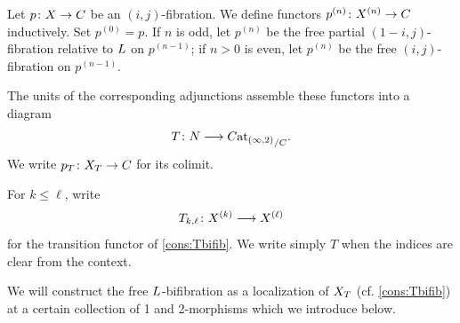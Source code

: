 \documentclass[a4paper,reqno,twoside]{amsart}
\begin{document}
\begin{construction}\label{cons:Tbifib}
	Let $p\colon\relax{X}\to\relax{C}$ be an $(i,j)$-fibration. We define functors $p^{(n)}\colon\relax{X}^{(n)}\to\relax{C}$ inductively. Set $p^{(0)}=p$. If $n$ is odd, let $p^{(n)}$ be the free partial $(1-i,j)$-fibration relative to $\relax{L}$ on $p^{(n-1)}$; if $n>0$ is even, let $p^{(n)}$ be the free $(i,j)$-fibration on $p^{(n-1)}$.

	The units of the corresponding adjunctions assemble these functors into a diagram
	\[
		T\colon\relax N\longrightarrow {\relax{C}\mathrm{at}_{(\infty,2)}}_{/\relax{C}}.
	\]
	We write $p_T\colon\relax{X}_T\to\relax{C}$ for its colimit.
\end{construction}

\begin{notation}\label{not:Tkell}
	For $k\leq\ell$, write
	\[
		T_{k,\ell}\colon\relax{X}^{(k)}\longrightarrow\relax{X}^{(\ell)}
	\]
	for the transition functor of \cref{cons:Tbifib}. We write simply $T$ when the indices are clear from the context.
\end{notation}

We will construct the free $\relax{L}$-bifibration as a localization of $\relax{X}_{T}$ (cf. \cref{cons:Tbifib}) at a certain collection of 1 and 2-morphisms which we introduce below.

\end{document}
